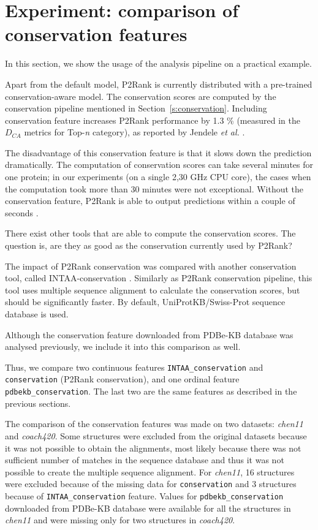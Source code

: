 \newpage
\section{Experiment: comparison of conservation features}

In this section, we show the usage of the analysis pipeline on a practical example.

Apart from the default model, P2Rank is currently distributed with a pre-trained conservation-aware model. The conservation scores are computed by the conservation pipeline mentioned in Section~\ref{s:conservation}. Including conservation feature increases P2Rank performance by 1.3 \% (measured in the $D_{CA}$ metrics for Top-\textit{n} category), as reported by Jendele \textit{et al.} \cite{prankweb}.

The disadvantage of this conservation feature is that it slows down the prediction dramatically. The computation of conservation scores can take several minutes for one protein; in our experiments (on a single 2,30 GHz CPU core), the cases when the computation took more than 30 minutes were not exceptional. Without the conservation feature, P2Rank is able to output predictions within a couple of seconds \cite{p2rank1}.

There exist other tools that are able to compute the conservation scores. The question is, are they as good as the conservation currently used by P2Rank?

The impact of P2Rank conservation was compared with another conservation tool, called INTAA-conservation \cite{intaa_github}. Similarly as P2Rank conservation pipeline, this tool uses multiple sequence alignment to calculate the conservation scores, but should be significantly faster. By default, UniProtKB/Swiss-Prot sequence database \cite{swissprot} is used.

Although the conservation feature downloaded from PDBe-KB database was analysed previously, we include it into this comparison as well.

Thus, we compare two continuous features \texttt{INTAA\_conservation} and \texttt{conservation} (P2Rank conservation), and one ordinal feature \texttt{pdbekb\_conservation}. The last two are the same  features as described in the previous sections.

The comparison of the conservation features was made on two datasets: \textit{chen11} and \textit{coach420}. Some structures were excluded from the original datasets because it was not possible to obtain the alignments, most likely because there was not sufficient number of matches in the sequence database and thus it was not possible to create the multiple sequence alignment. For \textit{chen11}, 16 structures were excluded because of the missing data for \texttt{conservation} and 3 structures because of \texttt{INTAA\_conservation} feature. Values for \texttt{pdbekb\_conservation} downloaded from PDBe-KB database were available for all the structures in \textit{chen11} and were missing only for two structures in \textit{coach420}. 

